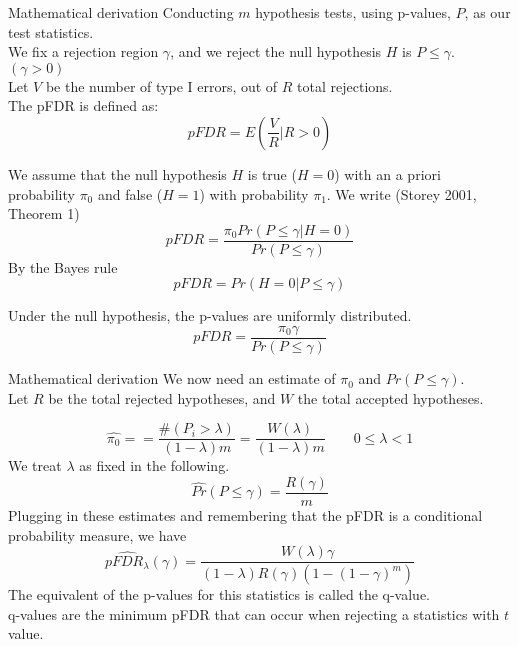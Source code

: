 \documentclass[8pt]{beamer}
\begin{document}
\begin{frame}{Mathematical derivation}
Conducting $m$ hypothesis tests, using p-values, $P$, as our test statistics.\\
We fix a rejection region $\gamma$, and we reject the null hypothesis $H$ is $P\leq\gamma$. $(\gamma>0)$\\
Let $V$ be the number of type I errors, out of $R$ total rejections.\\
The pFDR is defined as: 
\begin{equation*}
pFDR=E\left(\frac{V}{R}| R>0 \right)
\end{equation*}

We assume that the null hypothesis $H$ is true ($H=0$) with an a priori probability $\pi_0$ and false ($H=1$) with probability $\pi_1$. We write (Storey 2001, Theorem 1)\\
\begin{equation*}
pFDR=\frac{\pi_0 Pr(P\leq\gamma|H=0)}{Pr(P\leq\gamma)}
\end{equation*}
By the Bayes rule 
\begin{equation*}
pFDR = Pr(H=0|P\leq\gamma)
\end{equation*}

Under the null hypothesis, the p-values are uniformly distributed. 
\begin{equation*}
pFDR=\frac{\pi_0\gamma}{Pr(P\leq\gamma)}
\end{equation*} 
\end{frame}

\begin{frame}{Mathematical derivation}
We now need an estimate of $\pi_0$ and $Pr(P\leq\gamma)$.\\ 
Let $R$ be the total rejected hypotheses, and $W$ the total accepted hypotheses. 

\begin{equation*}
\hat{\pi_0}==\frac{\#(P_i>\lambda)}{(1-\lambda)m}=\frac{W(\lambda)}{(1-\lambda)m} \qquad 0\leq\lambda< 1
\end{equation*}
We treat $\lambda$ as fixed in the following. 
\begin{equation*}
\hat{Pr}(P\leq\gamma)=\frac{R(\gamma)}{m}
\end{equation*}
Plugging in these estimates and remembering that the pFDR is a conditional probability measure, we have 
\begin{equation*}
p\hat{FDR}_\lambda (\gamma)=\frac{W(\lambda)\gamma}{(1-\lambda)R(\gamma)(1-(1-\gamma)^m)}
\end{equation*}
The equivalent of the p-values for this statistics is called the q-value.\\
q-values are the minimum pFDR that can occur when rejecting a statistics with $t$ value. 
\end{frame}

\begin{frame}

\end{frame}
\end{document}
